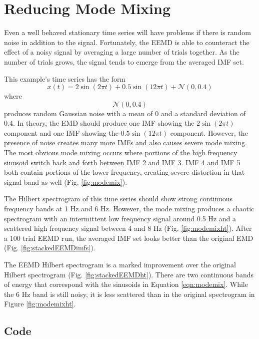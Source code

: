 \documentclass[12pt]{article}
\begin{document}
\FloatBarrier

\section{Reducing Mode Mixing}

Even a well behaved stationary time series will have problems if there is random noise in addition to the signal.
Fortunately, the EEMD is able to counteract the effect of a noisy signal by averaging a large number of trials together.
As the number of trials grows, the signal tends to emerge from the averaged IMF set.

This example's time series has the form
\begin{equation}
\label{eqn:modemix}
x (t) = 2 \sin(2\pi t) + 0.5\sin(12\pi t) + \mathcal{N}(0, 0.4)
\end{equation}
where 
\begin{equation*}
\mathcal{N}(0, 0.4)
\end{equation*}
produces random Gaussian noise with a mean of 0 and a standard deviation of 0.4.
In theory, the EMD should produce one IMF showing the $2 \sin(2\pi t)$ component and one IMF showing the $0.5\sin(12\pi t)$ component.
However, the presence of noise creates many more IMFs and also causes severe mode mixing.
The most obvious mode mixing occurs where portions of the high frequency sinusoid switch back and forth between IMF 2 and IMF 3.
IMF 4 and IMF 5 both contain portions of the lower frequency, creating severe distortion in that signal band as well (Fig. \ref{fig:modemix}).

The Hilbert spectrogram of this time series should show strong continuous frequency bands at 1 Hz and 6 Hz.
However, the mode mixing produces a chaotic spectrogram with an intermittent low frequency signal around 0.5 Hz and a scattered high frequency signal between 4 and 8 Hz (Fig. \ref{fig:modemixht}).
After a 100 trial EEMD run, the averaged IMF set looks better than the original EMD (Fig. \ref{fig:stackedEEMDimfs}).

The EEMD Hilbert spectrogram is a marked improvement over the original Hilbert spectrogram (Fig. \ref{fig:stackedEEMDht}).
There are two continuous bands of energy that correspond with the sinusoids in Equation \ref{eqn:modemix}.
While the 6 Hz band is still noisy, it is less scattered than in the original spectrogram in Figure \ref{fig:modemixht}.

\subsection{Code}
\end{document}
